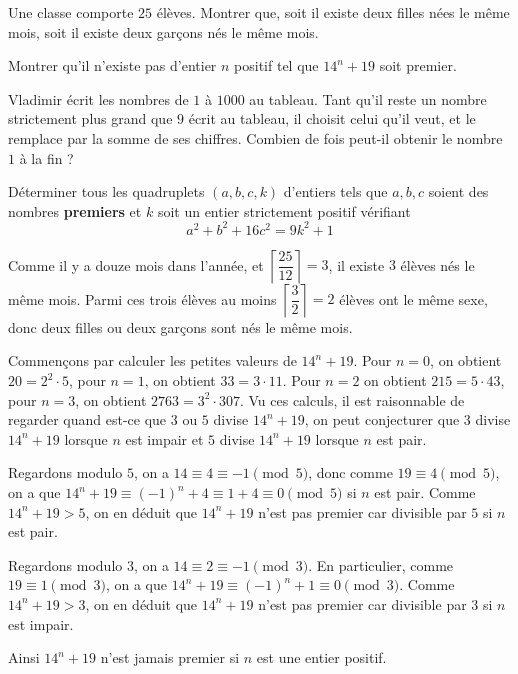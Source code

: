 

\begin{exo}
Une classe comporte $25$ élèves. Montrer que, soit il existe deux filles nées le même mois, soit il existe deux garçons nés le même mois.
\end{exo}


\begin{exo}
Montrer qu'il n'existe pas d'entier $n$ positif tel que $14^n+19$ soit premier.
\end{exo}


\begin{exo}
Vladimir écrit les nombres de $1$ à $1000$ au tableau. Tant qu'il reste un nombre strictement plus grand que $9$ écrit au tableau, il choisit celui qu'il veut, et le remplace par la somme de ses chiffres. Combien de fois peut-il obtenir le nombre $1$ à la fin ?
\end{exo}


\begin{exo}
Déterminer tous les quadruplets $(a, b, c, k)$ d'entiers tels que $a, b, c$ soient des nombres \textbf{premiers} et $k$ soit un entier strictement positif vérifiant
$$a^2 + b^2 + 16c^2 = 9k^2 + 1$$
\end{exo}




\begin{sol}
Comme il y a douze mois dans l'année, et $\left\lceil\dfrac{25}{12}\right\rceil = 3$, il existe $3$ élèves nés le même mois. Parmi ces trois élèves au moins $\left\lceil\dfrac 3{2}\right\rceil = 2$ élèves ont le même sexe, donc deux filles ou deux garçons sont nés le même mois.
\end{sol}


\begin{sol}
Commençons par calculer les petites valeurs de $14^n+19$. Pour $n=0$, on obtient $20=2^2\cdot 5$, pour $n=1$, on obtient $33=3\cdot 11$. Pour $n=2$ on obtient $215=5\cdot 43$, pour $n=3$, on obtient $2763=3^2\cdot 307$. Vu ces calculs, il est raisonnable de regarder quand est-ce que $3$ ou $5$ divise $14^n+19$, on peut conjecturer que $3$ divise $14^n+19$ lorsque $n$ est impair et $5$ divise $14^n+19$ lorsque $n$ est pair.

Regardons modulo $5$, on a $14\equiv 4\equiv -1\pmod 5$, donc comme $19\equiv 4\pmod 5$, on a que $14^n+19\equiv (-1)^n+4\equiv 1+4\equiv 0\pmod 5$ si $n$ est pair. Comme $14^n+19>5$, on en déduit que $14^n+19$ n'est pas premier car divisible par $5$ si $n$ est pair.

Regardons modulo $3$, on a $14\equiv 2\equiv -1\pmod 3$. En particulier, comme $19\equiv 1\pmod 3$, on a que $14^n+19\equiv (-1)^n+1\equiv 0 \pmod 3$. Comme $14^n+19>3$, on en déduit que $14^n+19$ n'est pas premier car divisible par $3$ si $n$ est impair.

Ainsi $14^n+19$ n'est jamais premier si $n$ est une entier positif.
\end{sol}



